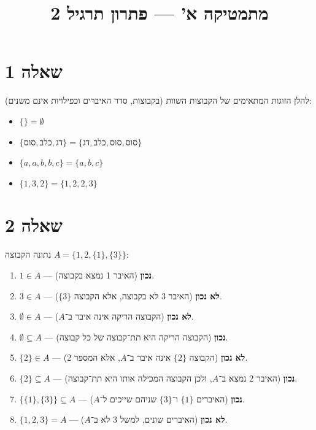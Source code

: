 

\usepackage{pgfplots}
\pgfplotsset{compat=1.18}

\title{מתמטיקה א' --- פתרון תרגיל 2}
\date{}



\maketitle

\section{שאלה 1}
להלן הזוגות המתאימים של הקבוצות השוות (בקבוצות, סדר האיברים וכפילויות אינם משנים):
\begin{itemize}
    \item $\{\} = \emptyset$
    \item $\{\text{סוס}, \text{כלב}, \text{דג}\} = \{\text{דג}, \text{כלב}, \text{סוס}, \text{סוס}\}$
    \item $\{a, a, b, b, c\} = \{a, b, c\}$
    \item $\{1, 3, 2\} = \{1, 2, 2, 3\}$
\end{itemize}

\section{שאלה 2}
נתונה הקבוצה $A = \{1, 2, \{1\}, \{3\}\}$:
\begin{enumerate}
    \item $1 \in A$ --- \textbf{נכון} (האיבר 1 נמצא בקבוצה).
    \item $3 \in A$ --- \textbf{לא נכון} (האיבר 3 לא בקבוצה, אלא הקבוצה $\{3\}$).
    \item $\emptyset \in A$ --- \textbf{לא נכון} (הקבוצה הריקה אינה איבר ב־$A$).
    \item $\emptyset \subseteq A$ --- \textbf{נכון} (הקבוצה הריקה היא תת־קבוצה של כל קבוצה).
    \item $\{2\} \in A$ --- \textbf{לא נכון} (הקבוצה $\{2\}$ אינה איבר ב־$A$, אלא המספר 2).
    \item $\{2\} \subseteq A$ --- \textbf{נכון} (האיבר 2 נמצא ב־$A$, ולכן הקבוצה המכילה אותו היא תת־קבוצה).
    \item $\{\{1\}, \{3\}\} \subseteq A$ --- \textbf{נכון} (האיברים $\{1\}$ ו־$\{3\}$ שניהם שייכים ל־$A$).
    \item $\{1, 2, 3\} = A$ --- \textbf{לא נכון} (האיברים שונים, למשל 3 לא ב־$A$).
\end{enumerate}

